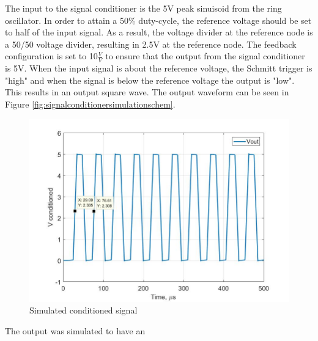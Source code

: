 The input to the signal conditioner is the 5V peak sinuisoid from the ring oscillator. In order to attain a 50\% duty-cycle, the reference voltage should be set to half of the input signal. As a result, the voltage divider at the reference node is a 50/50 voltage divider, resulting in 2.5V at the reference node. The feedback configuration is set to 10$\frac{V}{V}$ to ensure that the output from the signal conditioner is 5V. When the input signal is about the reference voltage, the Schmitt trigger is "high" and when the signal is below the reference voltage the output is "low". This results in an output square wave. The output waveform can be seen in Figure \ref{fig:signalconditionersimulationschem}.

\begin{figure}[H]
	\centering
	\includegraphics[width=0.6\linewidth]{Vconditioned_sim}
	\caption[Simulated conditioned signal]{Simulated conditioned signal}
	\label{fig:vconditionedsim}
\end{figure}

The output was simulated to have an




